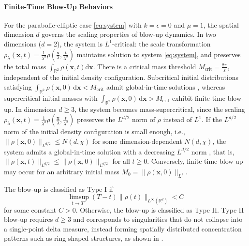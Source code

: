 \documentclass[review,onefignum,onetabnum]{siamart250211}
\begin{document}
\paragraph{Finite-Time Blow-Up Behaviors}
For the parabolic-elliptic case \eqref{eq:system} with \(k = \epsilon = 0\) and \(\mu = 1\), the spatial dimension \(d\) governs the scaling properties of blow-up dynamics. In two dimensions (\(d = 2\)), the system is \(L^1\)-critical: the scale transformation \(
\rho_\lambda(\mathbf{x},t) = \frac{1}{\lambda^2} \rho\left(\frac{\mathbf{x}}{\lambda}, \frac{t}{\lambda^2}\right)  
\) maintains solution to system \eqref{eq:system}, and preserves the total mass \(\int_{\mathbb{R}^2} \rho(\mathbf{x},t) \mathrm{d}\mathbf{x}\). There is a critical mass threshold \( M_{\text{crit}} = \frac{8\pi}{\chi} \), independent of the initial density configuration. Subcritical initial distributions satisfying \( \int_{\mathbb{R}^2} \rho(\mathbf{x},0)\,\mathrm{d}\mathbf{x} < M_{\text{crit}} \) admit global-in-time solutions \cite{dolbeault2004optimal}, whereas supercritical initial masses with \( \int_{\mathbb{R}^2} \rho(\mathbf{x},0)\,\mathrm{d}\mathbf{x} > M_{\text{crit}} \) exhibit finite-time blow-up. In dimensions \(d \geq 3\), the system becomes mass-supercritical, since the scaling \(\rho_\lambda(\mathbf{x},t) = \frac{1}{\lambda^d} \rho\left(\frac{\mathbf{x}}{\lambda}, \frac{t}{\lambda^2}\right)\) preserves the \(L^{d/2}\) norm of \(\rho\) instead of \(L^1\). If the \(L^{d/2}\) norm of the initial density configuration is small enough, i.e., \(\|\rho(\mathbf{x},0)\|_{L^{d/2}} \leq N(d,\chi)\) for some dimension-dependent \(N(d,\chi)\), the system admits a global-in-time solution with a decreasing \(L^{d/2}\) norm \cite{corrias2004global}, that is, \(\|\rho(\mathbf{x},t)\|_{L^{d/2}} \leq \|\rho(\mathbf{x},0)\|_{L^{d/2}}\) for all \(t \geq 0\). Conversely, finite-time blow-up may occur \cite{collapsing} for an arbitrary initial mass \(M_0 = \|\rho(\mathbf{x},0)\|_{L^1}\).  

The blow-up is classified as Type I if \[\limsup_{t \to T^-} (T - t)\|\rho(t)\|_{L^\infty(\mathbb{R}^d)} < C\] for some constant \(C > 0\). Otherwise, the blow-up is classified as Type II. Type II blow-up requires \(d \geq 3\) and corresponds to singularities that do not collapse into a single-point delta measure, instead forming spatially distributed concentration patterns such as ring-shaped structures, as shown in \cite{ring_ref}.
\end{document}
